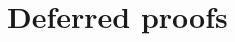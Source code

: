 \documentclass[10pt,a4paper]{article}
\newtheorem{corollary}[theorem]{Corollary}
\theoremstyle{definition}
\newcommand{\field}{\mathbb{F}}
\newcommand{\poly}{\operatorname{poly}}
\newcommand{\polylog}{\operatorname{polylog}}
\newcommand{\bitset}{\{0,1\}}
\newcommand{\dimension}{m}
\newcommand{\degree}{d}
\newcommand{\fieldsize}{q}
\def\fe#1{
    \ifnum#1=1
        \alpha
    \else
    \ifnum#1=2
        \beta
    \else
    \ifnum#1=3
        \gamma
    \fi\fi\fi
}
\begin{document}
    
    

\appendix

\section{Deferred proofs}
\label{sec:deferred-proofs}
\end{document}
